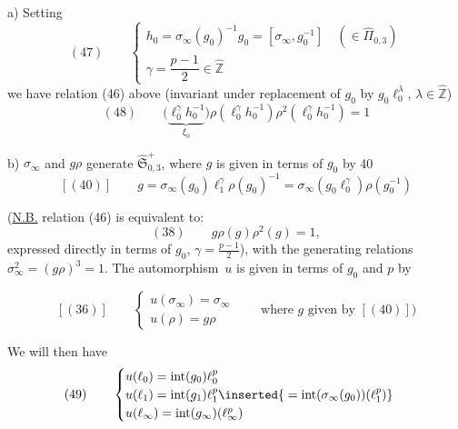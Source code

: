  a) Setting
\[
(47)\qquad
\begin{cases}
h_0=\sigma_\infty(g_0)^{-1}g_0=[\sigma_\infty,g_0^{-1}]
   \quad(\in\widehat{\Pi}_{0,3})\\
\gamma=\dfrac{p-1}{2}\in\widehat{\mathbb Z}
\end{cases}
\]
we have relation (46) above (invariant under replacement of $g_0$ by
$g_0\ell_0^\lambda$, $\lambda\in\widehat{\mathbb Z}$)
\[
(48)\qquad
\bigl(\underbrace{\ell_0^\gamma h_0^{-1}}_{\xi_0}\bigr)
\rho(\ell_0^\gamma h_0^{-1})\rho^2(\ell_0^\gamma h_0^{-1})=1
\]

 b) $\sigma_\infty$ and $g\rho$ generate 
$\widehat{\mathfrak S}_{0,3}^{+}$,
where $g$ is given in terms of $g_0$ by 40
\[
[(40)]\qquad
g=\sigma_\infty(g_0)\ell_1^\gamma\rho(g_0)^{-1}
=\sigma_\infty(g_0\ell_0^\gamma)\rho(g_0^{-1})
\]

(\uline{N.B.} relation (46) is equivalent to:
\[
(38)\qquad g\rho(g)\rho^2(g)=1,
\]
expressed directly in terms of $g_0$, $\gamma=\frac{p-1}{2}$),
with the generating relations $\sigma_\infty^2=(g\rho)^3=1$.
The automorphism\ $u$ is given in terms of $g_0$ and $p$ by


\[
[(36)]\qquad
\begin{cases}
u(\sigma_\infty)=\sigma_\infty\\
u(\rho)=g\rho
\end{cases}
\qquad\text{where }g\text{ given by }[(40)])
\]

We will then have
\[
(49)\qquad
\begin{cases}
u(\ell_0)=\operatorname{int}(g_0)\ell_0^p\\
u(\ell_1)=\operatorname{int}(g_1)\ell_1^p
 \inserted{{}=\operatorname{int}(\sigma_\infty(g_0))(\ell_1^p)}\\
u(\ell_\infty)=\operatorname{int}(g_\infty)(\ell_\infty^p)
\end{cases}
\]

